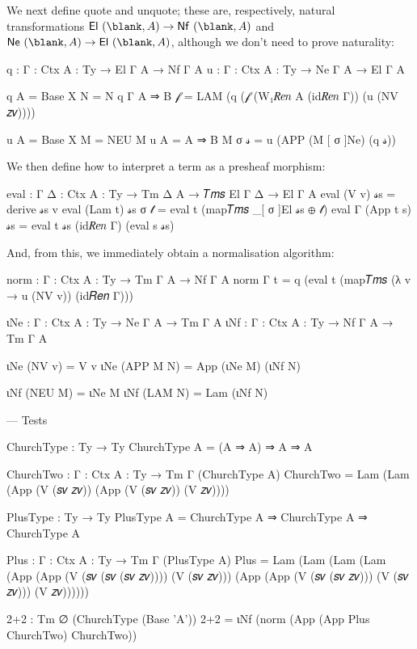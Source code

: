 \noindent
We next define quote and unquote; these are, respectively, natural
transformations $\mathsf{El}~(\blank,A) \to \mathsf{Nf}~(\blank,A)$ and
$\mathsf{Ne}~(\blank,A) \to \mathsf{El}~(\blank,A)$, although we don't need to
prove naturality:
\begin{code}
q : {Γ : Ctx} {A : Ty} → El Γ A → Nf Γ A
u : {Γ : Ctx} {A : Ty} → Ne Γ A → El Γ A

q {A = Base X} N = N
q {Γ} {A ⇒ B} 𝒻 = LAM (q (𝒻 (W₁𝑅𝑒𝑛 A (id𝑅𝑒𝑛 Γ)) (u (NV 𝑧𝑣))))

u {A = Base X} M = NEU M
u {A = A ⇒ B} M σ 𝓈 = u (APP (M [ σ ]Ne) (q 𝓈))
\end{code}
\noindent
We then define how to interpret a term as a presheaf morphism:
\begin{code}
eval : {Γ Δ : Ctx} {A : Ty} → Tm Δ A → 𝑇𝑚𝑠 El Γ Δ → El Γ A
eval (V v) 𝓈s = derive 𝓈s v
eval (Lam t) 𝓈s σ 𝓉 = eval t (map𝑇𝑚𝑠 _[ σ ]El 𝓈s ⊕ 𝓉)
eval {Γ} (App t s) 𝓈s = eval t 𝓈s (id𝑅𝑒𝑛 Γ) (eval s 𝓈s)
\end{code}
\noindent
And, from this, we immediately obtain a normalisation algorithm:
\begin{code}
norm : {Γ : Ctx} {A : Ty} → Tm Γ A → Nf Γ A
norm {Γ} t = q (eval t (map𝑇𝑚𝑠 (λ v → u (NV v)) (id𝑅𝑒𝑛 Γ)))
\end{code}

\begin{code}[hide]
ιNe : {Γ : Ctx} {A : Ty} → Ne Γ A → Tm Γ A
ιNf : {Γ : Ctx} {A : Ty} → Nf Γ A → Tm Γ A

ιNe (NV v) = V v
ιNe (APP M N) = App (ιNe M) (ιNf N)

ιNf (NEU M) = ιNe M
ιNf (LAM N) = Lam (ιNf N)

--- Tests

ChurchType : Ty → Ty
ChurchType A = (A ⇒ A) ⇒ A ⇒ A

ChurchTwo : {Γ : Ctx} {A : Ty} → Tm Γ (ChurchType A)
ChurchTwo = Lam (Lam (App (V (𝑠𝑣 𝑧𝑣)) (App (V (𝑠𝑣 𝑧𝑣)) (V 𝑧𝑣))))

PlusType : Ty → Ty
PlusType A = ChurchType A ⇒ ChurchType A ⇒ ChurchType A

Plus : {Γ : Ctx} {A : Ty} → Tm Γ (PlusType A)
Plus = Lam (Lam (Lam (Lam (App (App (V (𝑠𝑣 (𝑠𝑣 (𝑠𝑣 𝑧𝑣)))) (V (𝑠𝑣 𝑧𝑣)))
                               (App (App (V (𝑠𝑣 (𝑠𝑣 𝑧𝑣))) (V (𝑠𝑣 𝑧𝑣))) (V 𝑧𝑣))))))

2+2 : Tm ∅ (ChurchType (Base 'A'))
2+2 = ιNf (norm (App (App Plus ChurchTwo) ChurchTwo))
\end{code}